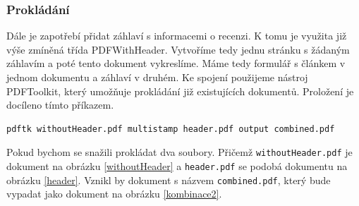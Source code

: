 \documentclass[czech,BP]{thesiskiv}
\begin{document}
\subsubsection{Prokládání}
Dále je zapotřebí přidat záhlaví s informacemi o recenzi. K tomu je využita již výše zmíněná třída PDFWithHeader. Vytvoříme tedy jednu stránku s žádaným záhlavím a poté tento dokument vykreslíme. Máme tedy formulář s článkem v jednom dokumentu a záhlaví v druhém. Ke spojení použijeme nástroj PDFToolkit, který umožňuje prokládání již existujících dokumentů. Proložení je docíleno tímto příkazem. 
\begin{lstlisting}
pdftk withoutHeader.pdf multistamp header.pdf output combined.pdf
\end{lstlisting}
Pokud bychom se snažili prokládat dva soubory. Přičemž \texttt{withoutHeader.pdf} je dokument na obrázku \ref{withoutHeader} a \texttt{header.pdf} se podobá dokumentu na obrázku \ref{header}. Vznikl by dokument s názvem \texttt{combined.pdf}, který bude vypadat jako dokument na obrázku \ref{kombinace2}.
\end{document}
